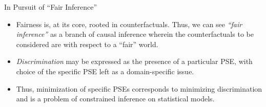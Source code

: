\documentclass[12pt,t,handout]{beamer}
\begin{document}
\begin{frame}[c]{In Pursuit of ``Fair Inference''}

\begin{center}
\begin{itemize}
  \itemsep10pt
  \item Fairness is, at its core, rooted in counterfactuals. Thus, we can see
    \textit{``fair inference''} as a branch of causal inference wherein the
    counterfactuals to be considered are with respect to a ``fair'' world.
  \item \textit{Discrimination} may be expressed as the presence of a particular
    PSE, with choice of the specific PSE left as a domain-specific issue.
  \item Thus, minimization of specific PSEs corresponds to minimizing
    discrimination and is a problem of constrained inference on statistical
    models.
\end{itemize}
\end{center}


\end{frame}

\end{document}
